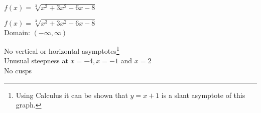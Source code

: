 {$f(x) = \sqrt[3]{x^{3} + 3x^{2} - 6x - 8}$}
{$f(x) = \sqrt[3]{x^{3} + 3x^{2} - 6x - 8}$\\
Domain: $(-\infty, \infty)$\\
\begin{center}
\end{center}

No vertical or horizontal asymptotes\footnote{Using Calculus it can be shown that $y = x + 1$ is a slant asymptote of this graph.}\\
Unusual steepness at $x = -4, x = -1$ and $x = 2$\\
No cusps\\

\begin{center}
\end{center}}